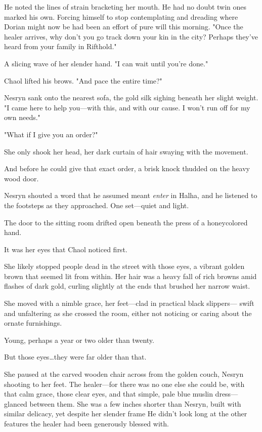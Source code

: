 He noted the lines of strain bracketing her mouth.
He had no doubt twin ones marked his own.
Forcing himself to stop contemplating and dreading where Dorian might now be had been an effort of pure will this morning.
"Once the healer arrives, why don't you go track down your kin in the city?
Perhaps they've heard from your family in Rifthold."

A slicing wave of her slender hand.
"I can wait until you're done."

Chaol lifted his brows.
"And pace the entire time?"

Nesryn sank onto the nearest sofa, the gold silk sighing beneath her slight weight.
"I came here to help you---with this, and with our cause.
I won't run off for my own needs."

"What if I give you an order?"

She only shook her head, her dark curtain of hair swaying with the movement.

And before he could give that exact order, a brisk knock thudded on the heavy wood door.

Nesryn shouted a word that he assumed meant \emph{enter} in Halha, and he listened to the footsteps as they approached.
One set---quiet and light.

The door to the sitting room drifted open beneath the press of a honeycolored hand.

It was her eyes that Chaol noticed first.

She likely stopped people dead in the street with those eyes, a vibrant golden brown that seemed lit from within.
Her hair was a heavy fall of rich browns amid flashes of dark gold, curling slightly at the ends that brushed her narrow waist.

She moved with a nimble grace, her feet---clad in practical black slippers--- swift and unfaltering as she crossed the room, either not noticing or caring about the ornate furnishings.

Young, perhaps a year or two older than twenty.

But those eyes\ldots they were far older than that.

She paused at the carved wooden chair across from the golden couch, Nesryn shooting to her feet.
The healer---for there was no one else she could be, with that calm grace, those clear eyes, and that simple, pale blue muslin dress--- glanced between them.
She was a few inches shorter than Nesryn, built with similar delicacy, yet despite her slender frame He didn't look long at the other features the healer had been generously blessed with.

